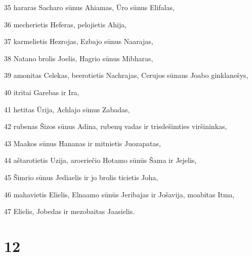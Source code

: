\par 35 hararas Sacharo sūnus Ahiamas, Ūro sūnus Elifalas, 
\par 36 mecherietis Heferas, pelojietis Ahija, 
\par 37 karmelietis Hezrojas, Ezbajo sūnus Naarajas, 
\par 38 Natano brolis Joelis, Hagrio sūnus Mibharas, 
\par 39 amonitas Celekas, beerotietis Nachrajas, Cerujos sūnaus Joabo ginklanešys, 
\par 40 itritai Garebas ir Ira, 
\par 41 hetitas Ūrija, Achlajo sūnus Zabadas, 
\par 42 rubenas Šizos sūnus Adina, rubenų vadas ir trisdešimties viršininkas, 
\par 43 Maakos sūnus Hananas ir mitnietis Juozapatas, 
\par 44 aštarotietis Uzija, aroeriečio Hotamo sūnūs Šama ir Jejelis, 
\par 45 Šimrio sūnus Jediaelis ir jo brolis ticietis Joha, 
\par 46 mahavietis Elielis, Elnaamo sūnūs Jeribajas ir Jošavija, moabitas Itma, 
\par 47 Elielis, Jobedas ir mezobaitas Jaasielis.



\chapter{12}


